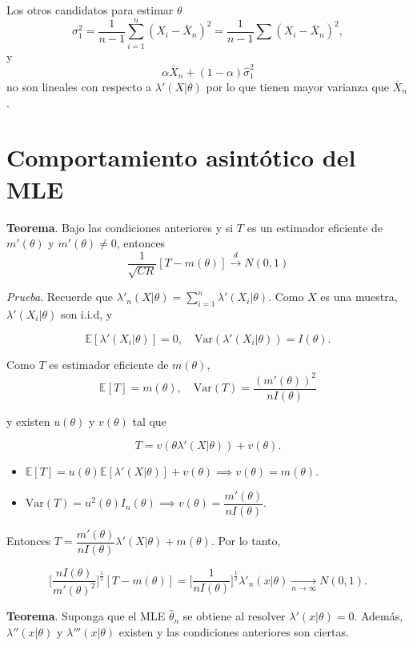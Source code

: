 \documentclass[
  12pt,
]{book}
\begin{document}
Los otros candidatos para estimar \(\theta\)
\[\sigma_1^2=\dfrac 1{n-1}\sum_{i=1}^{n}\left(X_{i}-\bar{X}_{n}\right)^{2} = \dfrac 1{n-1}\sum (X_i-\bar X_n)^2,\]
y
\[\alpha \bar X_n + (1-\alpha)\hat\sigma^2_1\]
no son lineales con respecto a \(\lambda'(X|\theta)\) por lo que tienen mayor varianza que \(\bar X_n\).

\hypertarget{comportamiento-asintuxf3tico-del-mle}{%
\section{Comportamiento asintótico del MLE}\label{comportamiento-asintuxf3tico-del-mle}}

\textbf{Teorema}. Bajo las condiciones anteriores y si \(T\) es un estimador eficiente de \(m'(\theta)\) y \(m'(\theta) \neq 0\), entonces
\[\dfrac 1{\sqrt{CR}}[T-m(\theta)]\xrightarrow{d}N(0,1)\]

\emph{Prueba}. Recuerde que \(\lambda'_n(X|\theta) = \sum_{i=1}^n\lambda'(X_i|\theta)\). Como \(X\) es una muestra, \(\lambda'(X_i|\theta)\) son i.i.d, y

\[\mathbb E[\lambda'(X_i|\theta)] = 0, \quad \text{Var}(\lambda'(X_i|\theta)) = I(\theta).\]

Como \(T\) es estimador eficiente de \(m(\theta)\),
\[\mathbb E[T] = m(\theta), \quad \text{Var}(T) = \dfrac{(m'(\theta))^2}{nI(\theta)}\]

y existen \(u(\theta)\) y \(v(\theta)\) tal que

\[T = v(\theta \lambda'(X|\theta)) + v(\theta).\]

\begin{itemize}
\item
  \(\mathbb E [T]= u(\theta)\mathbb E[\lambda'(X|\theta)] + v(\theta) \implies v(\theta) = m(\theta)\).
\item
  \(\text{Var}(T) = u^2(\theta)I_n(\theta) \implies v(\theta) = \dfrac{m'(\theta)}{nI(\theta)}\).
\end{itemize}

Entonces \(T = \dfrac{m'(\theta)}{nI(\theta)}\lambda'(X|\theta) + m(\theta)\). Por lo tanto,

\[\bigg[\dfrac{nI(\theta)}{m'(\theta)^2}\bigg]^{\frac 12}[T-m(\theta)] = \bigg[\dfrac 1 {nI(\theta)}\bigg]^{\frac 12}\lambda'_n(x|\theta) \xrightarrow[n\to\infty]{} N(0,1).\]

\textbf{Teorema}. Suponga que el MLE \(\hat \theta_n\) se obtiene al resolver \(\lambda'(x|\theta) = 0\). Además, \(\lambda''(x|\theta)\) y \(\lambda'''(x|\theta)\) existen y las condiciones anteriores son ciertas.
\end{document}
